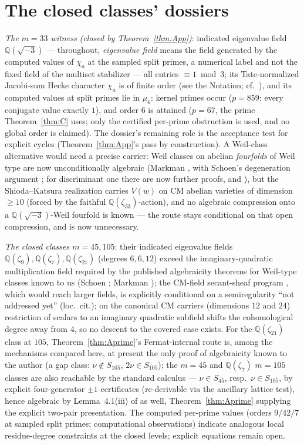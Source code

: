 \documentclass[11pt]{amsart}
\theoremstyle{remark}
\newcommand{\Q}{\mathbb{Q}}
\newcommand{\V}{V}
\newcommand{\zt}{\zeta}
\begin{document}
\section{The closed classes' dossiers}\label{sec:dossier}
\emph{The $m=33$ witness (closed by Theorem~\ref{thm:App})}: indicated eigenvalue field $\Q(\sqrt{-3})$ ---
throughout, \emph{eigenvalue field} means the field generated by the computed values of
$\chi_a$ at the sampled split primes, a numerical label and not the fixed field of the
multiset stabilizer --- all
entries $\equiv1\bmod3$; its Tate-normalized Jacobi-sum Hecke character $\chi_a$ is of
finite order (see the Notation; cf.\ \cite{Weil52}), and its computed values at split primes
lie in $\mu_6$: kernel primes occur
($p=859$: every conjugate value exactly $1$), and order $6$ is attained ($p=67$, the prime
Theorem~\ref{thm:C} uses; only the certified per-prime obstruction is used, and no global order
is claimed). The dossier's remaining role is the acceptance test for explicit cycles
(Theorem~\ref{thm:App}'s pass by construction). A Weil-class alternative would need a precise
carrier: Weil classes on abelian \emph{fourfolds} of Weil type are now unconditionally
algebraic (Markman \cite{Markman1}, with Schoen's degeneration argument \cite{Schoen}; for
discriminant one there are now further proofs, \cite{FloccariFu} and \cite{vGR}), but
the Shioda--Katsura realization carries $\V(w)$ on CM abelian varieties of dimension $\ge10$
(forced by the faithful $\Q(\zt_{33})$-action), and no algebraic compression onto a
$\Q(\sqrt{-3})$-Weil fourfold is known --- the route stays conditional on that open
compression, and is now unnecessary.

\emph{The closed classes $m=45,105$}: their indicated eigenvalue fields $\Q(\zt_9),\Q(\zt_7),\Q(\zt_{21})$
(degrees $6,6,12$) exceed the imaginary-quadratic multiplication field required by the published
algebraicity theorems for Weil-type classes known to us (Schoen \cite{Schoen}; Markman
\cite{Markman1}); the CM-field secant-sheaf program \cite{Markman2}, which would reach larger fields,
is explicitly conditional on a semiregularity ``not addressed yet'' (loc.\ cit.); on
the canonical CM carriers (dimensions $12$ and $24$) restriction of scalars to an imaginary quadratic
subfield shifts the cohomological degree away from $4$, so no descent to the covered case exists.
For the $\Q(\zt_{21})$ class at $105$, Theorem~\ref{thm:Aprime}'s Fermat-internal route is,
among the mechanisms compared here, at present
the only proof of algebraicity known to the author (a gap class: $\nu\notin S_{105}$,
$2\nu\in S_{105}$); the
$m=45$ and $\Q(\zt_7)$ $m=105$ classes are also reachable by the standard calculus --- $\nu\in S_{45}$,
resp.\ $\nu\in S_{105}$, by explicit four-generator $\pm1$ certificates (re-derivable via the ancillary
lattice test), hence algebraic by Lemma~4.1(iii) of \cite{Aoki00} as well, Theorem~\ref{thm:Aprime}
supplying the explicit two-pair presentation. The computed per-prime values (orders $9/42/7$ at
sampled split primes; computational observations) indicate analogous local residue-degree
constraints at the closed levels; explicit equations remain open.
\end{document}
